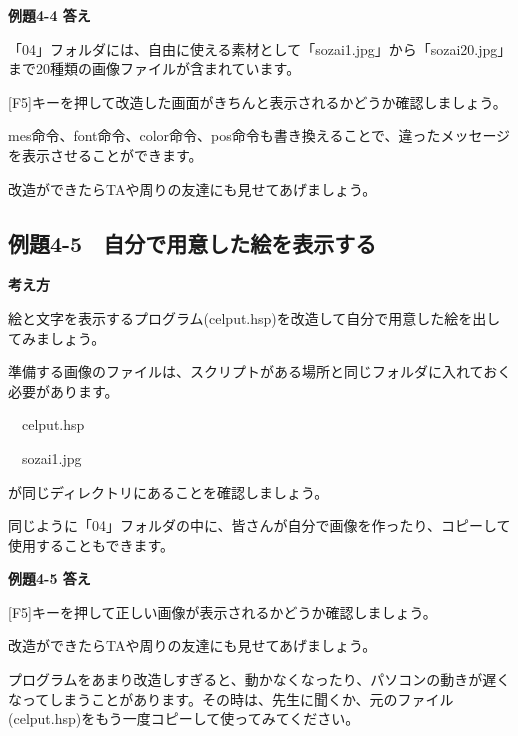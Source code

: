 \documentclass[a4paper,12pt]{jarticle}
\begin{document}
{\bfseries
例題4-4 答え}

\bigskip

「04」フォルダには、自由に使える素材として「sozai1.jpg」から「sozai20.jpg」まで20種類の画像ファイルが含まれています。

[F5]キーを押して改造した画面がきちんと表示されるかどうか確認しましょう。

mes命令、font命令、color命令、pos命令も書き換えることで、違ったメッセージを表示させることができます。

改造ができたらTAや周りの友達にも見せてあげましょう。

\bigskip


\clearpage
\subsection{例題4-5　自分で用意した絵を表示する}
\bigskip
\bigskip

{\bfseries
考え方}

\bigskip

絵と文字を表示するプログラム(celput.hsp)を改造して自分で用意した絵を出してみましょう。

準備する画像のファイルは、スクリプトがある場所と同じフォルダに入れておく必要があります。


\bigskip

\ \ celput.hsp

\ \ sozai1.jpg


\bigskip

が同じディレクトリにあることを確認しましょう。

同じように「04」フォルダの中に、皆さんが自分で画像を作ったり、コピーして使用することもできます。


\bigskip


\bigskip


\bigskip


\bigskip

{\bfseries
例題4-5 答え}


\bigskip

[F5]キーを押して正しい画像が表示されるかどうか確認しましょう。

改造ができたらTAや周りの友達にも見せてあげましょう。


\bigskip

プログラムをあまり改造しすぎると、動かなくなったり、パソコンの動きが遅くなってしまうことがあります。その時は、先生に聞くか、元のファイル(celput.hsp)をもう一度コピーして使ってみてください。


\bigskip
\end{document}
